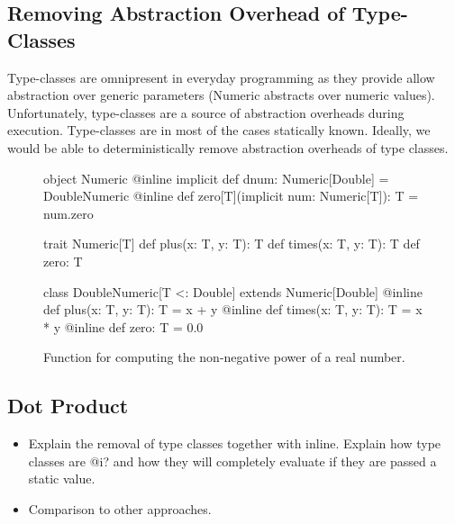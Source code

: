 \subsection{Removing Abstraction Overhead of Type-Classes}
\label{sct:type-classes-removal}
Type-classes are omnipresent in everyday programming as they provide allow abstraction over
 generic parameters (\eg Numeric abstracts over numeric values). Unfortunately,
 type-classes are a source of abstraction overheads during execution. Type-classes
 are in most of the cases statically known. Ideally, we would be able to
 deterministically remove abstraction overheads of type classes.

\begin{figure}
\begin{listing}
object Numeric {
  @inline implicit def dnum: Numeric[Double] = DoubleNumeric
  @inline def zero[T](implicit num: Numeric[T]): T = num.zero
}

trait Numeric[T] {
  def plus(x: T, y: T): T
  def times(x: T, y: T): T
  def zero: T
}

class DoubleNumeric[T <: Double] extends Numeric[Double] {
  @inline def plus(x: T, y: T): T = x + y
  @inline def times(x: T, y: T): T = x * y
  @inline def zero: T = 0.0
}
\end{listing}
\caption{\label{fig:numeric} Function for computing the non-negative power of a real number.}
\end{figure}


\subsection{Dot Product}
\label{sct:dot-product}
\begin{itemize}
  \item Explain the removal of type classes together with inline. Explain how type classes
  are @i? and how they will completely evaluate if they are passed a static value.
  \item Comparison to other approaches.
\end{itemize}

